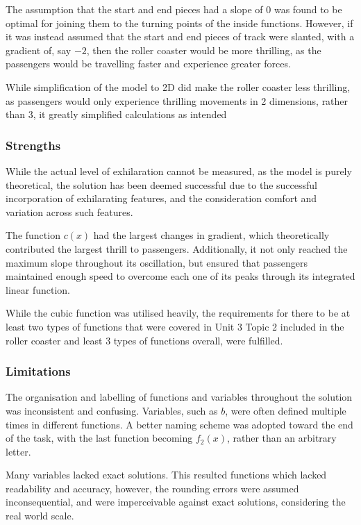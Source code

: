 \documentclass[10pt, letterpaper]{article}
\begin{document}
The assumption that the start and end pieces had a slope of 0 was found to be optimal for joining them to the turning points of the inside functions. However, if it was instead assumed that the start and end pieces of track were slanted, with a gradient of, say $-2$, then the roller coaster would be more thrilling, as the passengers would be travelling faster and experience greater forces.


While simplification of the model to 2D did make the roller coaster less thrilling, as passengers would only experience thrilling movements in 2 dimensions, rather than 3, it greatly simplified calculations as intended


\subsubsection{Strengths}
While the actual level of exhilaration cannot be measured, as the model is purely theoretical, the solution has been deemed successful due to the successful incorporation of exhilarating features, and the consideration comfort and variation across such features.

The function $c(x)$ had the largest changes in gradient, which theoretically contributed the largest thrill to passengers. Additionally, it not only reached the maximum slope throughout its oscillation, but ensured that passengers maintained enough speed to overcome each one of its peaks through its integrated linear function.

While the cubic function was utilised heavily, the requirements for there to be at least two types of functions that were covered in Unit 3 Topic 2 included in the roller coaster and least 3 types of functions overall, were fulfilled.



\subsubsection{Limitations}


The organisation and labelling of functions and variables throughout the solution was inconsistent and confusing. Variables, such as $b$, were often defined multiple times in different functions. A better naming scheme was adopted toward the end of the task, with the last function becoming $f_2(x)$, rather than an arbitrary letter. 

Many variables lacked exact solutions. This resulted functions which lacked readability and accuracy, however, the rounding errors were assumed inconsequential, and were imperceivable against exact solutions, considering the real world scale.
\end{document}
